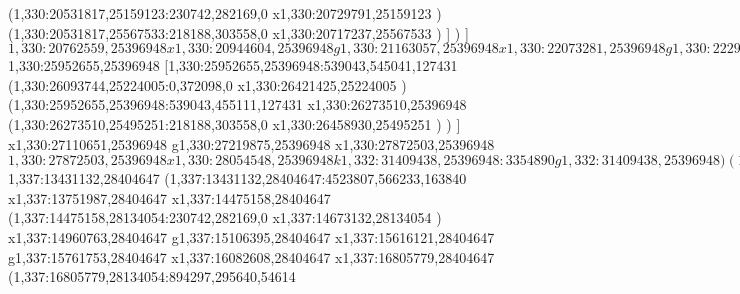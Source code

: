 {(1,330:20531817,25159123:230742,282169,0
x1,330:20729791,25159123
)
(1,330:20531817,25567533:218188,303558,0
x1,330:20717237,25567533
)
]
)
]
$1,330:20762559,25396948
x1,330:20944604,25396948
g1,330:21163057,25396948
x1,330:22073281,25396948
g1,330:22291734,25396948
x1,330:24987818,25396948
g1,330:25206271,25396948
x1,330:25734202,25396948
g1,330:25952655,25396948
$1,330:25952655,25396948
[1,330:25952655,25396948:539043,545041,127431
(1,330:26093744,25224005:0,372098,0
x1,330:26421425,25224005
)
(1,330:25952655,25396948:539043,455111,127431
x1,330:26273510,25396948
(1,330:26273510,25495251:218188,303558,0
x1,330:26458930,25495251
)
)
]
x1,330:27110651,25396948
g1,330:27219875,25396948
x1,330:27872503,25396948
$1,330:27872503,25396948
x1,330:28054548,25396948
k1,332:31409438,25396948:3354890
g1,332:31409438,25396948
)
(1,333:10437920,26671048:20971518,455111,127431
(1,332:10437920,26671048:0,291271,0
g1,332:10437920,26671048
g1,332:9127198,26671048
g1,332:8799518,26671048
(1,332:8799518,26671048:1310722,291271,0
k1,332:10110240,26671048:1310722
(1,332:10110240,26671048:0,291271,0
k1,332:9782559,26671048:-327681
x1,332:10110240,26671048
)
)
g1,332:10437920,26671048
)
x1,332:12058120,26671048
g1,332:12276573,26671048
x1,332:13259615,26671048
g1,332:13478068,26671048
x1,332:13951384,26671048
x1,332:14224450,26671048
g1,332:14442903,26671048
x1,332:15029087,26671048
x1,332:15356768,26671048
g1,332:15575221,26671048
x1,332:16266992,26671048
x1,332:17231831,26671048
g1,332:17450284,26671048
x1,332:18360508,26671048
g1,332:18578961,26671048
x1,332:20920056,26671048
g1,332:21138509,26671048
x1,332:22667686,26671048
g1,332:22886139,26671048
x1,332:23250229,26671048
x1,332:23577910,26671048
g1,332:23796363,26671048
x1,332:24779405,26671048
g1,332:24997858,26671048
x1,332:27748556,26671048
k1,333:31409438,26671048:3660882
g1,333:31409438,26671048
)
(1,337:10437920,28404647:20971518,976821,449545
g1,337:13431132,28404647
(1,337:13431132,28404647:4523807,976821,449545
g1,337:13431132,28404647
(1,337:13431132,28404647:0,550500,235932
[1,337:13431132,28404647:0,550500,235932
(1,21:13431132,28404647:0,550500,235932
r1,337:13431132,28404647:0,786432,235932
)
]
)
(1,337:13431132,28404647:4523807,566233,163840
$1,337:13431132,28404647
(1,337:13431132,28404647:4523807,566233,163840
x1,337:13751987,28404647
x1,337:14475158,28404647
(1,337:14475158,28134054:230742,282169,0
x1,337:14673132,28134054
)
x1,337:14960763,28404647
g1,337:15106395,28404647
x1,337:15616121,28404647
g1,337:15761753,28404647
x1,337:16082608,28404647
x1,337:16805779,28404647
(1,337:16805779,28134054:894297,295640,54614
}

